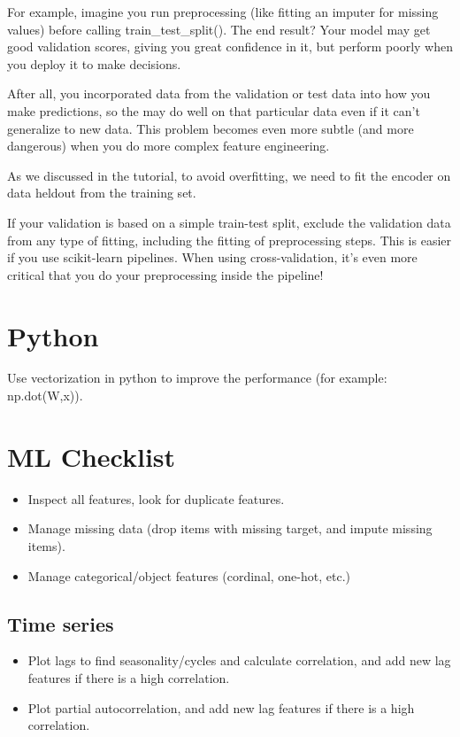 \documentclass[12pt]{report}
\begin{document}
For example, imagine you run preprocessing (like fitting an imputer for missing values) before calling train\_test\_split(). The end result? Your model may get good validation scores, giving you great confidence in it, but perform poorly when you deploy it to make decisions.

After all, you incorporated data from the validation or test data into how you make predictions, so the may do well on that particular data even if it can't generalize to new data. This problem becomes even more subtle (and more dangerous) when you do more complex feature engineering.

As we discussed in the tutorial, to avoid overfitting, we need to fit the encoder on data heldout from the training set.

If your validation is based on a simple train-test split, exclude the validation data from any type of fitting, including the fitting of preprocessing steps. This is easier if you use scikit-learn pipelines. When using cross-validation, it's even more critical that you do your preprocessing inside the pipeline!


\section{Python}

Use vectorization in python to improve the performance (for example: np.dot(W,x)).


\section{ML Checklist}

\begin{itemize}
  \item Inspect all features, look for duplicate features.
  \item Manage missing data (drop items with missing target, and impute missing items).
  \item Manage categorical/object features (cordinal, one-hot, etc.)
\end{itemize}
\subsection{Time series}

\begin{itemize}
  \item Plot lags to find seasonality/cycles and calculate correlation, and add new lag features if there is a high correlation.
  \item Plot partial autocorrelation, and add new lag features if there is a high correlation.
\end{itemize}
\end{document}
